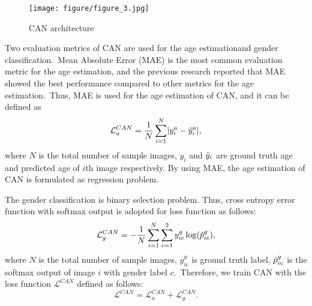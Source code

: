 \documentclass[10pt,twocolumn,letterpaper]{article}
\begin{document}
\label{CAN}
\begin{figure}[!h]
\begin{center}
    \texttt{[image: figure/figure\_3.jpg]}
\end{center}
\caption{CAN architecture}
\label{fig:figure_3}
\end{figure}

Two evaluation metrics of CAN are used for the age estimationand gender classification.~Mean Absolute Error (MAE) is the most common evaluation metric for the age estimation, and the previous research \cite{Xing2017} reported that MAE showed the best performance compared to other metrics for the age estimation.~Thus, MAE is used for the age estimation of CAN, and it can be defined as
\begin{equation}
\label{eq1}
\mathcal{L}_{a}^{CAN}=\frac{1}{N}\sum_{i=1}^N\lvert y_{i}^a-\Tilde{y}_{i}^a\rvert,
\end{equation}
where $N$ is the total number of sample images, $y_i$ and $\Tilde{y}_i$ are ground truth age and predicted age of $i$th image respectively. By using MAE, the age estimation of CAN is formulated as regression problem.

The gender classification is binary selection problem. Thus, cross entropy error function with softmax output is adopted for loss function as follows:
\begin{equation}
\label{eq2}
\mathcal{L}_{g}^{CAN}=-\frac{1}{N}\sum_{i=1}^N\sum_{c=1}^2y_{ic}^g\log(\Tilde{p}_{ic}^g),
\end{equation}
where  $N$ is the total number of sample images, $y^g_{ic}$ is ground truth label, $\Tilde{p}_{ic}^g$ is the softmax output of image $i$ with gender label $c$.~Therefore, we train CAN with the loss function $\mathcal{L}^{CAN}$ defined as follows:
\begin{equation}
\label{loss_CAN}
    \mathcal{L}^{CAN}=\mathcal{L}_a^{CAN}+\mathcal{L}_g^{CAN}.
\end{equation}


\end{document}

